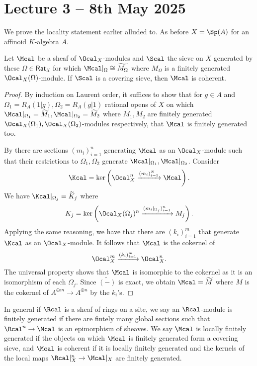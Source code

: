 \section{Lecture 3 -- 8th May 2025}\label{sec: lecture 3}
We prove the locality statement earlier alluded to. As before
$X=\Sp(A)$ for an affinoid $K$-algebra $A$.
\begin{proposition}\label{prop: coherent module is local}
    Let $\Mcal$ be a sheaf of $\Ocal_X$-modules and $\Scal$ 
the sieve on $X$ generated by these $\Omega\in \mathsf{Rat}_X$ 
for which $\Mcal|_{\Omega}\cong \widetilde{M_{\Omega}}$ where $M_{\Omega}$ is a finitely generated $\Ocal_{X}(\Omega)$-module. If $\Scal$ is
a covering sieve, then $\Mcal$ is coherent. 
\end{proposition}
\begin{proof}
    By induction on Laurent order, it suffices to show that for $g\in A$ and $\Omega_{1}=R_{A}(1|g),\Omega_{2}=R_{A}(g|1)$ rational opens of $X$ on which $\Mcal|_{\Omega_{1}}=\widetilde{M_{1}},\Mcal|_{\Omega_{2}}=\widetilde{M_{2}}$
where $M_1, M_2$ are finitely generated $\Ocal_{X}(\Omega_{1}),\Ocal_{X}(\Omega_{2})$-modules respectively, that $\Mcal$ is finitely generated too. 

    By  there are sections $(m_{i})_{i=1}^{n}$ generating $\Mcal$ as an $\Ocal_{X}$-module such that their restrictions to $\Omega_{1},\Omega_{2}$ generate $\Mcal|_{\Omega_{1}},\Mcal|_{\Omega_{2}}$. Consider 
    $$\Kcal=\ker\left(\Ocal_{X}^{n}\xrightarrow{(m_{i})_{i=1}^{N}}\Mcal\right).$$
    We have $\Kcal|_{\Omega_{j}}= \widetilde{K}_{j}$ where 
    $$K_{j}=\ker\left(\Ocal_{X}(\Omega_{j})^{n}\xrightarrow{(m_{i}|_{\Omega_{j}})_{i=1}^{n}} M_{j}\right).$$
    Applying the same reasoning, we have that there are $(k_{i})_{i=1}^{m}$ that generate $\Kcal$ as an $\Ocal_{X}$-module. It follows that $\Mcal$ is the cokernel of 
    $$\Ocal_{X}^{m}\xrightarrow{(k_{i})_{i=1}^{m}}\Ocal_{X}^{n}.$$
    The universal property shows that $\Mcal$ is isomorphic to the cokernel as it is an isomorphism of each $\Omega_{j}$. Since $\widetilde{(-)}$ is exact, we obtain $\Mcal=\widetilde{M}$ where $M$ is the cokernel of $A^{\oplus m}\to A^{\oplus n}$ by the $k_{i}$'s. 
\end{proof}
\begin{remark}\label{rmk: finitely generated modules over sites}
    In general if $\Rcal$ is a sheaf of rings on a site, we say an $\Rcal$-module is finitely generated if there are fintely many global sections such that $\Rcal^{n}\to\Mcal$ is an epimorphism of sheaves. We say $\Mcal$ is locally finitely generated if the objects on which $\Mcal$ is finitely generated form a covering sieve, and $\Mcal$ is coherent if it is locally finitely generated and the kernels of the local maps $\Rcal|_{X}^{n}\to\Mcal|_{X}$ are finitely generated. 
\end{remark}
